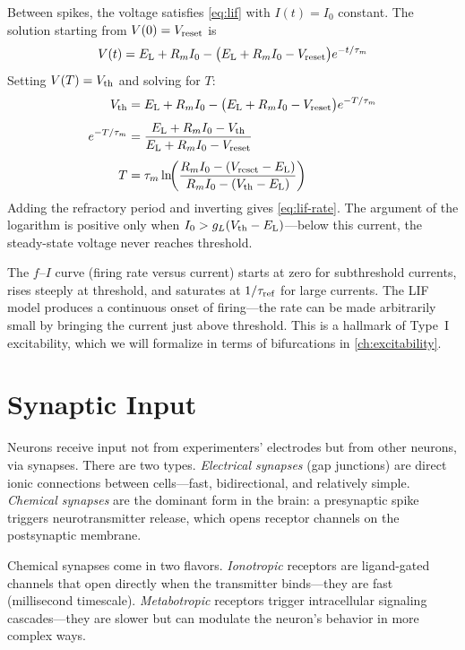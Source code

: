 \begin{derivation}
Between spikes, the voltage satisfies \cref{eq:lif} with $I(t) = I_0$ constant. The solution starting from $V(0) = V_{\text{reset}}$ is
\[
  V(t) = E_{\mathrm{L}} + R_m I_0 - \bigl(E_{\mathrm{L}} + R_m I_0 - V_{\text{reset}}\bigr)e^{-t/\tau_m}
\]
Setting $V(T) = V_{\text{th}}$ and solving for $T$:
\begin{align*}
  V_{\text{th}} &= E_{\mathrm{L}} + R_m I_0 - \bigl(E_{\mathrm{L}} + R_m I_0 - V_{\text{reset}}\bigr)e^{-T/\tau_m} \\[4pt]
  e^{-T/\tau_m} &= \frac{E_{\mathrm{L}} + R_m I_0 - V_{\text{th}}}{E_{\mathrm{L}} + R_m I_0 - V_{\text{reset}}} \\[4pt]
  T &= \tau_m \ln\!\biggl(\frac{R_m I_0 - (V_{\text{reset}} - E_{\mathrm{L}})}{R_m I_0 - (V_{\text{th}} - E_{\mathrm{L}})}\biggr)
\end{align*}
Adding the refractory period and inverting gives \cref{eq:lif-rate}. The argument of the logarithm is positive only when $I_0 > g_L(V_{\text{th}} - E_{\mathrm{L}})$---below this current, the steady-state voltage never reaches threshold.
\end{derivation}

\noindent The $f$--$I$ curve (firing rate versus current) starts at zero for subthreshold currents, rises steeply at threshold, and saturates at $1/\tau_{\text{ref}}$ for large currents. The LIF model produces a continuous onset of firing---the rate can be made arbitrarily small by bringing the current just above threshold. This is a hallmark of Type~I excitability, which we will formalize in terms of bifurcations in \cref{ch:excitability}.

\section{Synaptic Input}
\label{sec:synapses}

Neurons receive input not from experimenters' electrodes but from other neurons, via synapses. There are two types. \emph{Electrical synapses} (gap junctions) are direct ionic connections between cells---fast, bidirectional, and relatively simple. \emph{Chemical synapses} are the dominant form in the brain: a presynaptic spike triggers neurotransmitter release, which opens receptor channels on the postsynaptic membrane.

Chemical synapses come in two flavors. \emph{Ionotropic} receptors are ligand-gated channels that open directly when the transmitter binds---they are fast (millisecond timescale). \emph{Metabotropic} receptors trigger intracellular signaling cascades---they are slower but can modulate the neuron's behavior in more complex ways.

